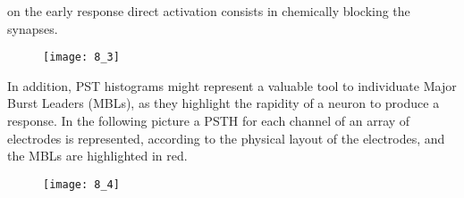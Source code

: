 on the early response direct activation consists in chemically blocking the synapses.
\begin{figure}[H]
    \texttt{[image: 8\_3]}
    \centering
\end{figure}
In addition, PST histograms might represent a valuable tool to individuate Major Burst
Leaders (MBLs), as they highlight the rapidity of a neuron to produce a response. In the
following picture a PSTH for each channel of an array of electrodes is represented,
according to the physical layout of the electrodes, and the MBLs are highlighted in red.
\begin{figure}[H]
    \texttt{[image: 8\_4]}
    \centering
\end{figure}
